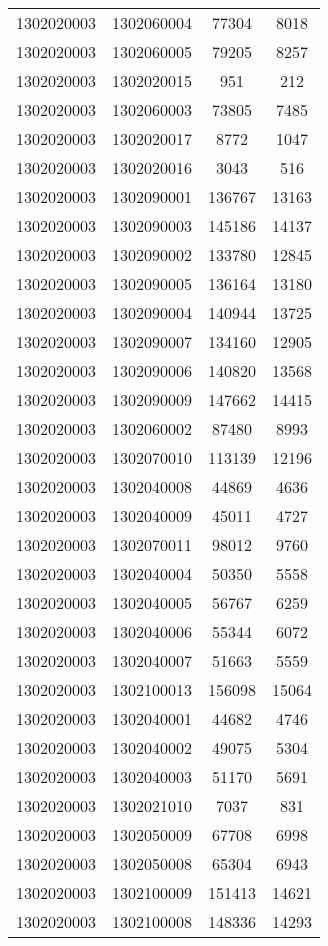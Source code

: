 \begin{longtable}[h]{llcc}
		1302020003 & 1302060004 & 77304 & 8018\\
		1302020003 & 1302060005 & 79205 & 8257\\
		1302020003 & 1302020015 & 951 & 212\\
		1302020003 & 1302060003 & 73805 & 7485\\
		1302020003 & 1302020017 & 8772 & 1047\\
		1302020003 & 1302020016 & 3043 & 516\\
		1302020003 & 1302090001 & 136767 & 13163\\
		1302020003 & 1302090003 & 145186 & 14137\\
		1302020003 & 1302090002 & 133780 & 12845\\
		1302020003 & 1302090005 & 136164 & 13180\\
		1302020003 & 1302090004 & 140944 & 13725\\
		1302020003 & 1302090007 & 134160 & 12905\\
		1302020003 & 1302090006 & 140820 & 13568\\
		1302020003 & 1302090009 & 147662 & 14415\\
		1302020003 & 1302060002 & 87480 & 8993\\
		1302020003 & 1302070010 & 113139 & 12196\\
		1302020003 & 1302040008 & 44869 & 4636\\
		1302020003 & 1302040009 & 45011 & 4727\\
		1302020003 & 1302070011 & 98012 & 9760\\
		1302020003 & 1302040004 & 50350 & 5558\\
		1302020003 & 1302040005 & 56767 & 6259\\
		1302020003 & 1302040006 & 55344 & 6072\\
		1302020003 & 1302040007 & 51663 & 5559\\
		1302020003 & 1302100013 & 156098 & 15064\\
		1302020003 & 1302040001 & 44682 & 4746\\
		1302020003 & 1302040002 & 49075 & 5304\\
		1302020003 & 1302040003 & 51170 & 5691\\
		1302020003 & 1302021010 & 7037 & 831\\
		1302020003 & 1302050009 & 67708 & 6998\\
		1302020003 & 1302050008 & 65304 & 6943\\
		1302020003 & 1302100009 & 151413 & 14621\\
		1302020003 & 1302100008 & 148336 & 14293\\

\end{longtable}
